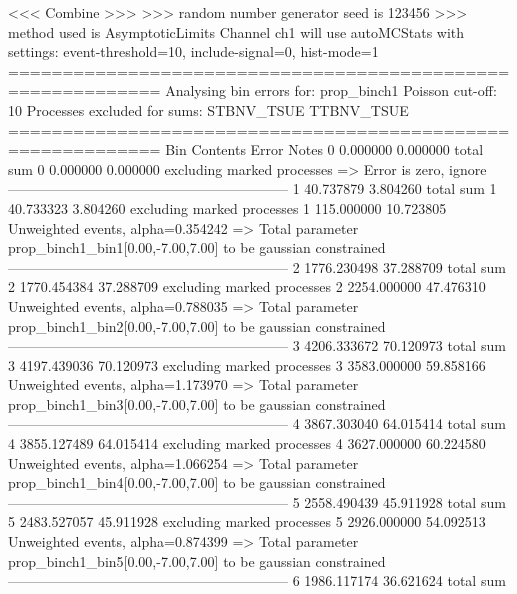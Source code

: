  <<< Combine >>> 
>>> random number generator seed is 123456
>>> method used is AsymptoticLimits
Channel ch1 will use autoMCStats with settings: event-threshold=10, include-signal=0, hist-mode=1
============================================================
Analysing bin errors for: prop_binch1
Poisson cut-off: 10
Processes excluded for sums: STBNV_TSUE TTBNV_TSUE
============================================================
Bin        Contents        Error           Notes                         
0          0.000000        0.000000        total sum                     
0          0.000000        0.000000        excluding marked processes    
  => Error is zero, ignore      
------------------------------------------------------------
1          40.737879       3.804260        total sum                     
1          40.733323       3.804260        excluding marked processes    
1          115.000000      10.723805       Unweighted events, alpha=0.354242
  => Total parameter prop_binch1_bin1[0.00,-7.00,7.00] to be gaussian constrained
------------------------------------------------------------
2          1776.230498     37.288709       total sum                     
2          1770.454384     37.288709       excluding marked processes    
2          2254.000000     47.476310       Unweighted events, alpha=0.788035
  => Total parameter prop_binch1_bin2[0.00,-7.00,7.00] to be gaussian constrained
------------------------------------------------------------
3          4206.333672     70.120973       total sum                     
3          4197.439036     70.120973       excluding marked processes    
3          3583.000000     59.858166       Unweighted events, alpha=1.173970
  => Total parameter prop_binch1_bin3[0.00,-7.00,7.00] to be gaussian constrained
------------------------------------------------------------
4          3867.303040     64.015414       total sum                     
4          3855.127489     64.015414       excluding marked processes    
4          3627.000000     60.224580       Unweighted events, alpha=1.066254
  => Total parameter prop_binch1_bin4[0.00,-7.00,7.00] to be gaussian constrained
------------------------------------------------------------
5          2558.490439     45.911928       total sum                     
5          2483.527057     45.911928       excluding marked processes    
5          2926.000000     54.092513       Unweighted events, alpha=0.874399
  => Total parameter prop_binch1_bin5[0.00,-7.00,7.00] to be gaussian constrained
------------------------------------------------------------
6          1986.117174     36.621624       total sum                     
